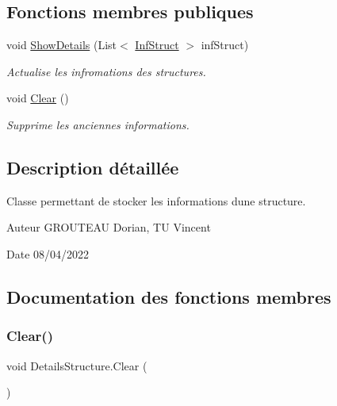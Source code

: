 \subsection*{Fonctions membres publiques}
\begin{DoxyCompactItemize}
\item 
void \mbox{\hyperlink{class_details_structure_a43f45ec1bc3888d7db09407d52964352}{Show\+Details}} (List$<$ \mbox{\hyperlink{class_inf_struct}{Inf\+Struct}} $>$ inf\+Struct)
\begin{DoxyCompactList}\small\item\em Actualise les infromations des structures. \end{DoxyCompactList}\item 
void \mbox{\hyperlink{class_details_structure_a4653aac26e25e56d4dd6b5f45ad9f4ef}{Clear}} ()
\begin{DoxyCompactList}\small\item\em Supprime les anciennes informations. \end{DoxyCompactList}\end{DoxyCompactItemize}


\subsection{Description détaillée}
Classe permettant de stocker les informations d\textquotesingle{}une structure. 

\begin{DoxyAuthor}{Auteur}
G\+R\+O\+U\+T\+E\+AU Dorian, TU Vincent 
\end{DoxyAuthor}
\begin{DoxyDate}{Date}
08/04/2022 
\end{DoxyDate}


\subsection{Documentation des fonctions membres}
\mbox{\label{class_details_structure_a4653aac26e25e56d4dd6b5f45ad9f4ef}} 
\subsubsection{\texorpdfstring{Clear()}{Clear()}}
{\footnotesize\ttfamily void Details\+Structure.\+Clear (\begin{DoxyParamCaption}{ }\end{DoxyParamCaption})\hspace{0.3cm}{\ttfamily [inline]}}




